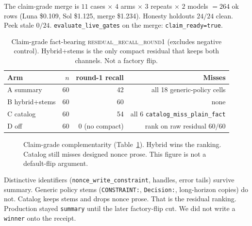\documentclass[11pt]{article}
\newcommand{\arm}[1]{\textsf{#1}}
\newcommand{\mode}[1]{\texttt{#1}}
\newcommand{\metric}[1]{\textsc{#1}}
\begin{document}
The claim-grade merge is $11$ cases $\times$ $4$ arms $\times$ $3$
repeats $\times$ $2$ models $= 264$ ok rows (Luna \$0.109, Sol
\$1.125, merge \$1.234). Honesty holdouts $24/24$ clean. Peek stale
$0/24$. \texttt{evaluate\_live\_gates} on the merge:
\texttt{claim\_ready=true}.

\begin{table}[ht]
\centering
\caption{Claim-grade fact-bearing \metric{residual\_recall\_round1}
(excludes negative control). Hybrid+stems is the only compact residual
that keeps both channels. Not a factory flip.}
\label{tab:claim}
\begin{tabular}{@{}lrrr@{}}
\toprule
Arm & $n$ & round-1 recall & Misses \\
\midrule
\arm{A} summary & 60 & 42 & all 18 generic-policy cells \\
\arm{B} hybrid+stems & 60 & 60 & none \\
\arm{C} catalog & 60 & 54 & all 6 \texttt{catalog\_miss\_plain\_fact} \\
\arm{D} off & 60 & 0 (no compact) & rank on raw residual $60/60$ \\
\bottomrule
\end{tabular}
\end{table}

\begin{figure}[H]
\centering
{}
\caption{Claim-grade complementarity (Table~\ref{tab:claim}). Hybrid
wins the ranking. Catalog still misses designed nonce prose. This
figure is not a default-flip argument.}
\label{fig:bars}
\end{figure}

Distinctive identifiers (\texttt{nonce\_write\_constraint}, handles,
error tails) survive summary. Generic policy stems
(\texttt{CONSTRAINT:}, \texttt{Decision:}, long-horizon copies) do
not. Catalog keeps stems and drops nonce prose. That is the residual
ranking. Production stayed \mode{summary} until the later
factory-flip cut. We did not write a \texttt{winner} onto the
receipt.
\end{document}
